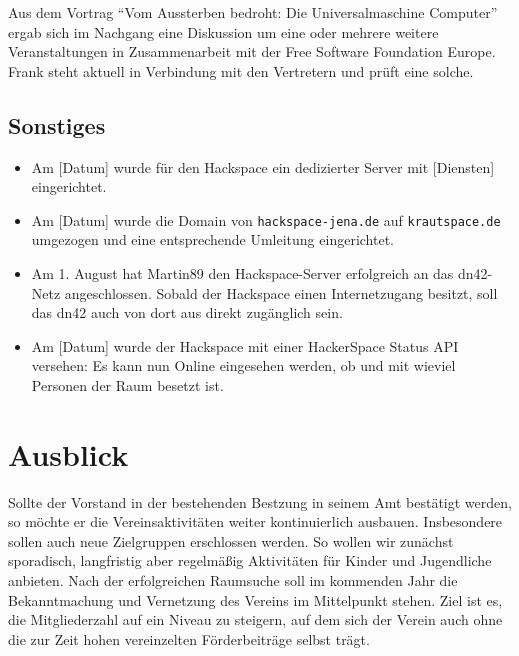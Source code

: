 \documentclass[10pt,DIV16]{scrartcl}
\begin{document}
Aus dem Vortrag "`Vom Aussterben bedroht: Die Universalmaschine
Computer"' ergab sich im Nachgang eine Diskussion um eine oder
mehrere weitere Veranstaltungen in Zusammenarbeit mit der Free
Software Foundation Europe. Frank steht aktuell in Verbindung mit
den Vertretern und prüft eine solche.

\subsection{Sonstiges}

\begin{itemize}
	\item
		Am [Datum] wurde für den Hackspace ein dedizierter Server mit
		[Diensten] eingerichtet.
	\item
		Am [Datum] wurde die Domain von \texttt{hackspace-jena.de} auf
		\texttt{krautspace.de} umgezogen und eine entsprechende Umleitung
		eingerichtet.
	\item
		Am 1. August hat Martin89 den Hackspace-Server erfolgreich an das
		dn42-Netz angeschlossen.  Sobald der Hackspace einen Internetzugang
		besitzt, soll das dn42 auch von dort aus direkt zugänglich sein.
	\item
		Am [Datum] wurde der Hackspace mit einer HackerSpace Status API
		versehen:  Es kann nun Online eingesehen werden, ob und mit wieviel
		Personen der Raum besetzt ist.
\end{itemize}

\section{Ausblick}

Sollte der Vorstand in der bestehenden Bestzung in seinem Amt bestätigt
werden, so möchte er die Vereinsaktivitäten weiter kontinuierlich ausbauen.
Insbesondere sollen auch neue Zielgruppen erschlossen werden.  So wollen wir
zunächst sporadisch, langfristig aber regelmäßig Aktivitäten für Kinder und
Jugendliche anbieten.  Nach der erfolgreichen Raumsuche soll im kommenden Jahr
die Bekanntmachung und Vernetzung des Vereins im Mittelpunkt stehen.  Ziel ist
es, die Mitgliederzahl auf ein Niveau zu steigern, auf dem sich der Verein
auch ohne die zur Zeit hohen vereinzelten Förderbeiträge selbst trägt.
\end{document}
